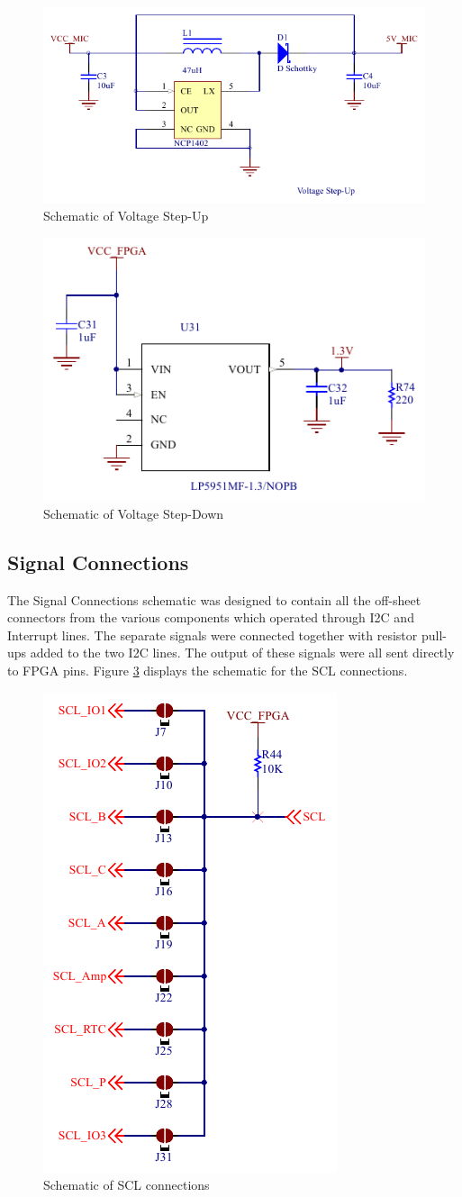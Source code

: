 \begin{figure}
	\includegraphics[width=0.5\linewidth]{Figures/voltage_stepup.pdf}\centering
	\caption{Schematic of Voltage Step-Up}
	\label{fig:stepup}
\end{figure}

\begin{figure}
	\includegraphics[width=0.5\linewidth]{Figures/voltage_stepdown.pdf}\centering
	\caption{Schematic of Voltage Step-Down}
	\label{fig:stepdown}
\end{figure}

\subsection{Signal Connections}

	The Signal Connections schematic was designed to contain all the off-sheet connectors from the various components which operated through I2C and Interrupt lines. 
The separate signals were connected together with resistor pull-ups added to the two I2C lines. 
The output of these signals were all sent directly to FPGA pins. 
Figure \ref{fig:SCL} displays the schematic for the SCL connections. 

\begin{figure}
	\includegraphics[width=0.5\linewidth]{Figures/SCL_lines.pdf}\centering
	\caption{Schematic of SCL connections}
	\label{fig:SCL}
\end{figure}


